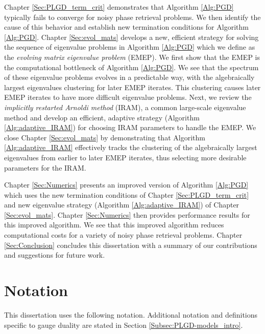 Chapter \ref{Sec:PLGD_term_crit} demonstrates that Algorithm \ref{Alg:PGD} typically fails to converge for noisy phase retrieval problems. 
We then identify the cause of this behavior and establish new termination conditions for Algorithm \ref{Alg:PGD}.
Chapter \ref{Sec:evol_mats} develops a new, efficient strategy for solving the sequence of eigenvalue problems in Algorithm \ref{Alg:PGD} which we define as the \textit{evolving matrix eigenvalue problem} (EMEP).
We first show that the EMEP is the computational bottleneck of Algorithm \ref{Alg:PGD}.
We see that the spectrum of these eigenvalue problems evolves in a predictable way, with the algebraically largest eigenvalues clustering for later EMEP iterates.
This clustering causes later EMEP iterates to have more difficult eigenvalue problems.
Next, we review the \textit{implicitly restarted Arnoldi method} (IRAM), a common large-scale eigenvalue method and develop an efficient, adaptive strategy (Algorithm \ref{Alg:adaptive_IRAM}) for choosing IRAM parameters to handle the EMEP.
We close Chapter \ref{Sec:evol_mats} by demonstrating that Algorithm \ref{Alg:adaptive_IRAM} effectively tracks the clustering of the algebraically largest eigenvalues from earlier to later EMEP iterates, thus selecting more desirable parameters for the IRAM.


Chapter \ref{Sec:Numerics} presents an improved version of Algorithm \ref{Alg:PGD} which uses the new termination conditions of Chapter \ref{Sec:PLGD_term_crit} and new eigenvalue strategy (Algorithm \ref{Alg:adaptive_IRAM}) of Chapter \ref{Sec:evol_mats}.
Chapter \ref{Sec:Numerics} then provides performance results for this improved algorithm.
We see that this improved algorithm reduces computational costs for a variety of noisy phase retrieval problems.
Chapter \ref{Sec:Conclusion} concludes this dissertation with a summary of our contributions and suggestions for future work.








\section{Notation}		\label{Subsec:Intro-notation}


This dissertation uses the following notation.  Additional notation and definitions specific to gauge duality are stated in Section \ref{Subsec:PLGD-models_intro}.  

